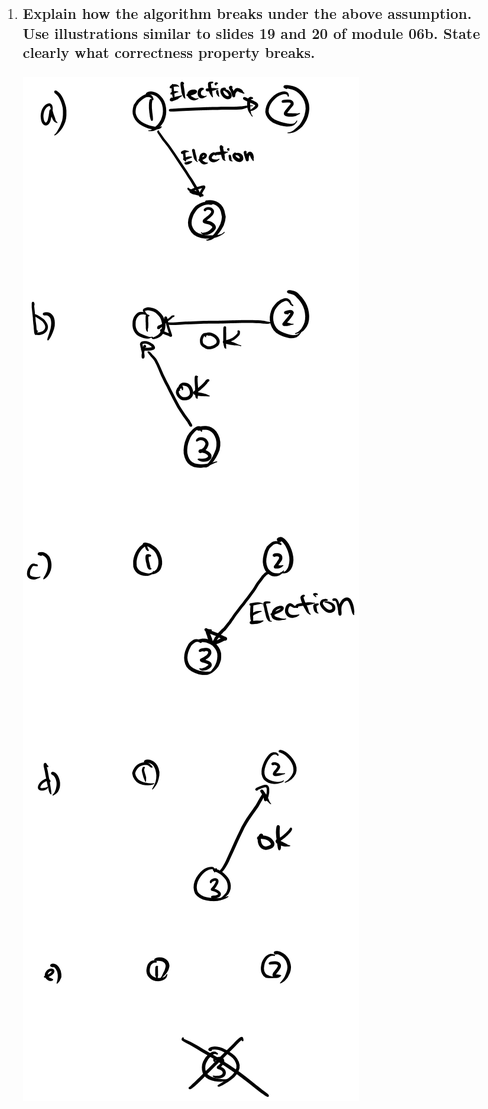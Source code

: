 \documentclass[12pt,a4paper]{article}
\begin{document}
\begin{enumerate}[label=(\alph*)]

\item \textbf{Explain how the algorithm breaks under the above assumption. Use illustrations similar to slides 19 and 20 of module 06b. State clearly what correctness property breaks.}

\includegraphics[scale=0.5]{4a}


\end{enumerate}
\end{document}
